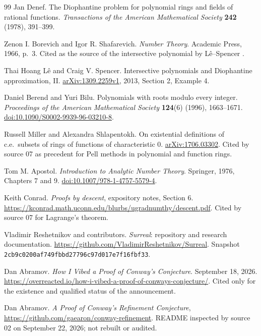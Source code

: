 \documentclass[11pt,oneside]{article}
\numberwithin{equation}{section}
\theoremstyle{definition}
\theoremstyle{remark}
\newcommand{\pin}{\texttt{2cb9c0200af749fbbd27796c97d017e7f16fbf33}}
\begin{document}
\begin{thebibliography}{99}
Jan Denef.
The Diophantine problem for polynomial rings and fields of rational
functions.
\emph{Transactions of the American Mathematical Society} \textbf{242} (1978),
391--399.

Zenon I. Borevich and Igor R. Shafarevich.
\emph{Number Theory}. Academic Press, 1966, p.~3. Cited as the source of the
intersective polynomial by L\^e--Spencer \cite{LeSpencer}.

Thai Hoang L\^e and Craig V. Spencer.
Intersective polynomials and Diophantine approximation, II.
\href{https://arxiv.org/abs/1309.2259v1}{arXiv:1309.2259v1}, 2013, Section 2,
Example 4.

Daniel Berend and Yuri Bilu.
Polynomials with roots modulo every integer.
\emph{Proceedings of the American Mathematical Society} \textbf{124}(6)
(1996), 1663--1671.
\href{https://doi.org/10.1090/S0002-9939-96-03210-8}{doi:10.1090/S0002-9939-96-03210-8}.

Russell Miller and Alexandra Shlapentokh.
On existential definitions of c.e.\ subsets of rings of functions of
characteristic 0.
\href{https://arxiv.org/abs/1706.03302}{arXiv:1706.03302}. Cited by source 07
as precedent for Pell methods in polynomial and function rings.

Tom M. Apostol.
\emph{Introduction to Analytic Number Theory}. Springer, 1976, Chapters 7
and 9.
\href{https://doi.org/10.1007/978-1-4757-5579-4}{doi:10.1007/978-1-4757-5579-4}.

Keith Conrad.
\emph{Proofs by descent}, expository notes, Section 6.
\url{https://kconrad.math.uconn.edu/blurbs/ugradnumthy/descent.pdf}. Cited by
source 07 for Lagrange's theorem.

Vladimir Reshetnikov and contributors.
\emph{Surreal}: repository and research documentation.
\url{https://github.com/VladimirReshetnikov/Surreal}.
Snapshot \pin.

Dan Abramov.
\emph{How I Vibed a Proof of Conway's Conjecture}. September 18, 2026.
\url{https://overreacted.io/how-i-vibed-a-proof-of-conways-conjecture/}.
Cited only for the existence and qualified status of the announcement.

Dan Abramov.
\emph{A Proof of Conway's Refinement Conjecture},
\url{https://github.com/gaearon/conway-refinement}. README inspected by
source 02 on September 22, 2026; not rebuilt or audited.


\end{thebibliography}
\end{document}
